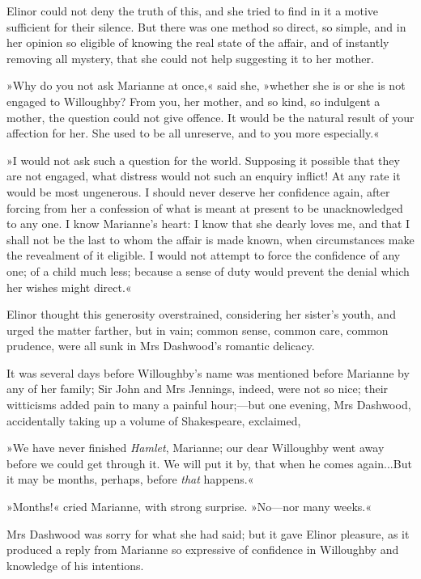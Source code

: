 Elinor could not deny the truth of this, and she tried to find in it a motive sufficient for their silence. But there was one method so direct, so simple, and in her opinion so eligible of knowing the real state of the affair, and of instantly removing all mystery, that she could not help suggesting it to her mother.

»Why do you not ask Marianne at once,« said she, »whether she is or she is not engaged to Willoughby? From you, her mother, and so kind, so indulgent a mother, the question could not give offence. It would be the natural result of your affection for her. She used to be all unreserve, and to you more especially.«

»I would not ask such a question for the world. Supposing it possible that they are not engaged, what distress would not such an enquiry inflict! At any rate it would be most ungenerous. I should never deserve her confidence again, after forcing from her a confession of what is meant at present to be unacknowledged to any one. I know Marianne’s heart: I know that she dearly loves me, and that I shall not be the last to whom the affair is made known, when circumstances make the revealment of it eligible. I would not attempt to force the confidence of any one; of a child much less; because a sense of duty would prevent the denial which her wishes might direct.«

Elinor thought this generosity overstrained, considering her sister’s youth, and urged the matter farther, but in vain; common sense, common care, common prudence, were all sunk in Mrs Dashwood’s romantic delicacy.

It was several days before Willoughby’s name was mentioned before Marianne by any of her family; Sir John and Mrs Jennings, indeed, were not so nice; their witticisms added pain to many a painful hour;—but one evening, Mrs Dashwood, accidentally taking up a volume of Shakespeare, exclaimed,

»We have never finished \textit{Hamlet}, Marianne; our dear Willoughby went away before we could get through it. We will put it by, that when he comes again...But it may be months, perhaps, before \textit{that} happens.«

»Months!« cried Marianne, with strong surprise. »No—nor many weeks.«

Mrs Dashwood was sorry for what she had said; but it gave Elinor pleasure, as it produced a reply from Marianne so expressive of confidence in Willoughby and knowledge of his intentions.


